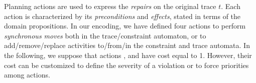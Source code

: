 Planning actions are used to express the \emph{repairs} on the original trace $t$. Each action is characterized by its \emph{preconditions} and \emph{effects}, stated in terms of the domain propositions. In our encoding, we have defined four actions to perform \emph{synchronous moves} both in the trace/constraint automaton, or to add/remove/replace activities to/from/in the constraint and trace automata. In the following, we suppose that actions ,  and  have cost equal to 1. However, their cost can be customized to define the severity of a violation or to force priorities among actions.
%
